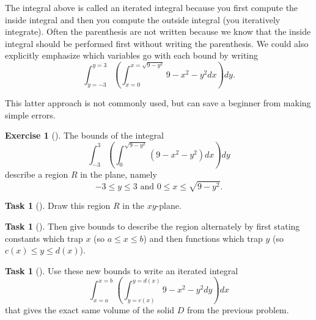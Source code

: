 \documentclass[10pt,]{book}
\theoremstyle{plain}
\theoremstyle{definition}
\theoremstyle{definition}
\theoremstyle{definition}
\theoremstyle{definition}
\newtheorem{exploration}[project]{Exercise}
\newtheorem{task}[project]{Task}
\theoremstyle{definition}
\numberwithin{equation}{section}
\newcommand{\ds}{\displaystyle}
\begin{document}
The integral above is called an iterated integral because you first compute the inside integral and then you compute the outside integral (you iteratively integrate). Often the parenthesis are not written because we know that the inside integral should be performed first without writing the parenthesis. We could also explicitly emphasize which variables go with each bound by writing%
\begin{equation*}
\ds\int_{y=-3}^{y=3} \left(\int_{x=0}^{x=\sqrt{9-y^2}}9-x^2-y^2 dx\right) dy.
\end{equation*}
%
\par
This latter approach is not commonly used, but can save a beginner from making simple errors.%
\begin{exploration}[]\label{exploration-249}
The bounds of the integral%
\begin{equation*}
\ds\int_{-3}^{3} \left(\int_0^{\sqrt{9-y^2}}(9-x^2-y^2) dx\right) dy
\end{equation*}
describe a region \(R\) in the plane, namely%
\begin{equation*}
-3\leq y\leq 3 \text{ and }  0\leq x\leq \sqrt{9-y^2}.
\end{equation*}
%
\begin{task}[]\label{task-668}
Draw this region \(R\) in the \(xy\)-plane.%
\end{task}
\begin{task}[]\label{task-669}
Then give bounds to describe the region alternately by first stating constants which trap \(x\) (so \(a\leq x\leq b\)) and then functions which trap \(y\) (so \(c(x)\leq y \leq d(x)\)).%
\end{task}
\begin{task}[]\label{task-670}
Use these new bounds to write an iterated integral%
\begin{equation*}
\ds\int_{x=a}^{x=b} \left(\int_{y=c(x)}^{y=d(x)}9-x^2-y^2 dy\right) dx
\end{equation*}
that gives the exact same volume of the solid \(D\) from the previous problem.%
\end{task}
\end{exploration}
\end{document}

